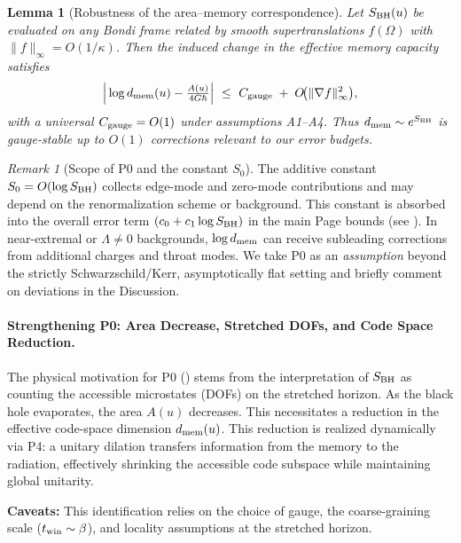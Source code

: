 \documentclass[a4paper,11pt]{article}
\theoremstyle{plain}
\newtheorem{lemma}{Lemma}
\theoremstyle{definition}
\theoremstyle{remark}
\newtheorem{remark}{Remark}
\begin{document}
\begin{lemma}[Robustness of the area--memory correspondence]\label{lem:gauge-robustness}
Let \(S_{\rm BH}(u)\) be evaluated on any Bondi frame related by smooth supertranslations \(f(\Omega)\) with \(\|f\|_\infty=O(1/\kappa)\).
Then the induced change in the effective memory capacity satisfies
\[
\Big|\log d_{\rm mem}(u)-\tfrac{A(u)}{4G\hbar}\Big|\ \le\ C_{\rm gauge}\;+\;O\!\big(\|\nabla f\|_\infty^2\big),
\]
with a universal \(C_{\rm gauge}=O(1)\) under assumptions A1--A4.
Thus \(d_{\rm mem}\sim e^{S_{\rm BH}}\) is gauge-stable up to \(O(1)\) corrections relevant to our error budgets.
\end{lemma}

\begin{remark}[Scope of P0 and the constant $S_0$]\label{rem:scope_P0}
The additive constant $S_0=O(\log S_{\rm BH})$ collects edge-mode and zero-mode contributions and may depend on the renormalization scheme or background. This constant is absorbed into the overall error term $(c_0 + c_1\log S_{\rm BH})$ in the main Page bounds (see ).
In near-extremal or $\Lambda\!\neq\!0$ backgrounds, $\log d_{\rm mem}$ can receive subleading corrections from additional charges and throat modes.
We take P0 as an \emph{assumption} beyond the strictly Schwarzschild/Kerr, asymptotically flat setting and briefly comment on deviations in the Discussion.
\end{remark}
\paragraph{Strengthening P0: Area Decrease, Stretched DOFs, and Code Space Reduction.}
The physical motivation for P0 () stems from the interpretation of $S_{\rm BH}$ as counting the accessible microstates (DOFs) on the stretched horizon. As the black hole evaporates, the area $A(u)$ decreases. This necessitates a reduction in the effective code-space dimension $d_{\rm mem}(u)$. This reduction is realized dynamically via P4: a unitary dilation transfers information from the memory to the radiation, effectively shrinking the accessible code subspace while maintaining global unitarity.

\textbf{Caveats:} This identification relies on the choice of gauge, the coarse-graining scale ($t_{\rm win} \sim \beta$), and locality assumptions at the stretched horizon.
\end{document}
